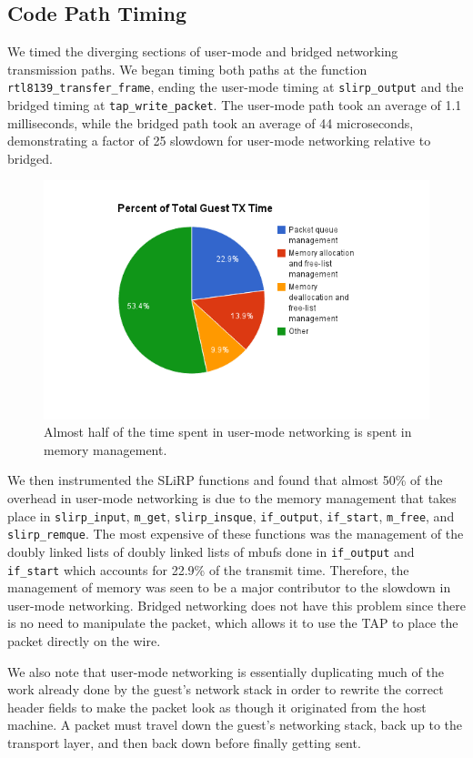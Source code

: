 \subsection{Code Path Timing}
\label{codePathTiming}
We timed the diverging sections of user-mode and bridged networking transmission paths. 
We began timing both paths at the function \texttt{rtl8139\_transfer\_frame}, ending the user-mode timing at \texttt{slirp\_output} and the bridged timing at \texttt{tap\_write\_packet}. 
The user-mode path took an average of 1.1 milliseconds, while the bridged path took an average of 44 microseconds, demonstrating a factor of 25 slowdown for user-mode networking relative to bridged.

\begin{figure}[htbp]
	\centering
		\includegraphics[scale=0.5]{usermodeTXtime}
	\caption{Almost half of the time spent in user-mode networking is spent in memory management.}
	\label{fig:usermodeTXtime}
\end{figure}

We then instrumented the SLiRP functions and found that almost 50\% of the overhead in user-mode networking is due to the memory management that takes place in \texttt{slirp\_input},
\texttt{m\_get}, \texttt{slirp\_insque}, \texttt{if\_output}, \texttt{if\_start}, \texttt{m\_free}, and \texttt{slirp\_remque}.
The most expensive of these functions was the management of the doubly linked lists of doubly linked lists of mbufs done in \texttt{if\_output} and \texttt{if\_start} which accounts for 22.9\%
of the transmit time.
Therefore, the management of memory was seen to be a major contributor to the slowdown in user-mode networking.
Bridged networking does not have this problem since there is no need to manipulate the packet, which allows it to use the TAP to place the packet directly on the wire.

We also note that user-mode networking is essentially duplicating much of the work already done by the guest's network stack in order to rewrite the correct header fields to make the packet
look as though it originated from the host machine.
A packet must travel down the guest's networking stack, back up to the transport layer, and then back down before finally getting sent.


